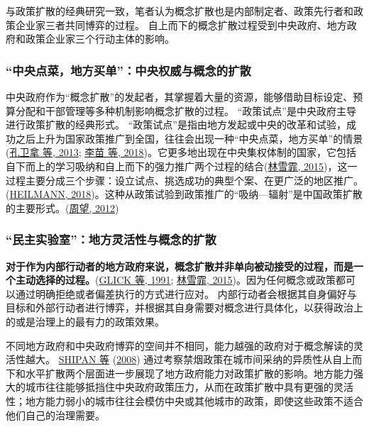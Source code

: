 \documentclass[
  12pt,
]{ctexart}
\begin{document}
与政策扩散的经典研究一致，笔者认为概念扩散也是内部制定者、政策先行者和政策企业家三者共同博弈的过程。
自上而下的概念扩散过程受到中央政府、地方政府和政策企业家三个行动主体的影响。

\hypertarget{ux4e2dux592eux70b9ux83dcux5730ux65b9ux4e70ux5355ux4e2dux592eux6743ux5a01ux4e0eux6982ux5ff5ux7684ux6269ux6563}{%
\subsubsection{``中央点菜，地方买单''：中央权威与概念的扩散}\label{ux4e2dux592eux70b9ux83dcux5730ux65b9ux4e70ux5355ux4e2dux592eux6743ux5a01ux4e0eux6982ux5ff5ux7684ux6269ux6563}}

中央政府作为``概念扩散''的发起者，其掌握着大量的资源，能够借助目标设定、预算分配和干部管理等多种机制影响概念扩散的过程。
``政策试点''是中央政府主导进行政策扩散的经典形式。
``政策试点''是指由地方发起或中央的改革和试验，成功之后上升为国家政策推广到全国，往往会出现一种``中央点菜，地方买单''的情景(\protect\hyperlink{ref-KongWeiNaZhangGuang2013}{孔卫拿 等, 2013}; \protect\hyperlink{ref-LiMiaoCuiJun2018}{李苗 等, 2018})。它更多地出现在中央集权体制的国家，它包括自下而上的学习吸纳和自上而下的强力推广两个过程的结合(\protect\hyperlink{ref-LinXueFei2015}{林雪霏, 2015})，这一过程主要分成三个步骤：设立试点、挑选成功的典型个案、在更广泛的地区推广。(\protect\hyperlink{ref-Heilmann2018}{HEILMANN, 2018})。这种从政策试验到政策推广的``吸纳---辐射''是中国政策扩散的主要形式。(\protect\hyperlink{ref-ZhouWang2012}{周望, 2012})

\hypertarget{ux6c11ux4e3bux5b9eux9a8cux5ba4ux5730ux65b9ux7075ux6d3bux6027ux4e0eux6982ux5ff5ux7684ux6269ux6563}{%
\subsubsection{``民主实验室''：地方灵活性与概念的扩散}\label{ux6c11ux4e3bux5b9eux9a8cux5ba4ux5730ux65b9ux7075ux6d3bux6027ux4e0eux6982ux5ff5ux7684ux6269ux6563}}

\textbf{对于作为内部行动者的地方政府来说，概念扩散并非单向被动接受的过程，而是一个主动选择的过程。}(\protect\hyperlink{ref-GlickHays1991}{GLICK 等, 1991}; \protect\hyperlink{ref-LinXueFei2015}{林雪霏, 2015})。因为任何概念或政策都可以通过明确拒绝或者偏差执行的方式进行应对。
内部行动者会根据其自身偏好与目标和外部行动者进行博弈，并根据其自身需要对概念进行具体化，以获得政治上的或是治理上的最有力的政策效果。

不同地方政府和中央政府博弈的空间并不相同，能力越强的政府对于概念解读的灵活性越大。
\protect\hyperlink{ref-ShipanVolden2008}{SHIPAN 等} (\protect\hyperlink{ref-ShipanVolden2008}{2008}) 通过考察禁烟政策在城市间采纳的异质性从自上而下和水平扩散两个层面进一步展现了地方政府能力对政策扩散的影响。地方能力强大的城市往往能够抵挡住中央政府政策压力，从而在政策扩散中具有更强的灵活性；地方能力弱小的城市往往会模仿中央或其他城市的政策，即使这些政策不适合他们自己的治理需要。
\end{document}
